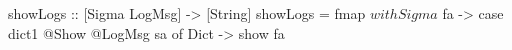 \begin{code}
showLogs :: [Sigma LogMsg] -> [String]
showLogs = fmap $ withSigma $ \sa fa ->
  case dict1 @Show @LogMsg sa of
    Dict -> show fa
\end{code}
